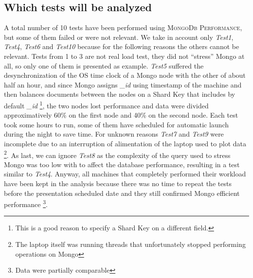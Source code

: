 \subsection{Which tests will be analyzed}
A total number of 10 tests have been performed using \textsc{MongoDb Performance}, but some of them failed or were not relevant.
We take in account only \textit{Test1}, \textit{Test4}, \textit{Test6} and \textit{Test10} because for the following reasons the others cannot be relevant.
Tests from 1 to 3 are not real load test, they did not “stress” Mongo at all, so only one of them is presented as example.
\textit{Test5} suffered the desynchronization of the OS time clock of a Mongo node with the other of about half an hour, and since Mongo assigns \textit{\_id} using timestamp of the machine and then balances documents between the nodes on a Shard Key that includes by default \textit{\_id} \footnote{This is a good reason to specify a Shard Key on a different field.}, the two nodes lost performance and data were divided approximatively 60\% on the first node and 40\% on the second node. 
Each test  took some hours to run, some of them have scheduled for automatic launch during the night to save time.
For unknown reasons \textit{Test7} and  \textit{Test9} were incomplete due to an interruption of alimentation of the laptop used to plot data \footnote{The laptop itself was running threads that unfortunately stopped performing operations on Mongo}.
As last, we can ignore \textit{Test8} as the complexity of the query used to stress Mongo was too low with to affect the database performance, resulting in a test similar to \textit{Test4}.
Anyway, all machines that completely performed their workload have been kept in the analysis because there was no time to repeat the tests before the presentation scheduled date and they still confirmed Mongo efficient performance \footnote{Data were partially comparable}.

